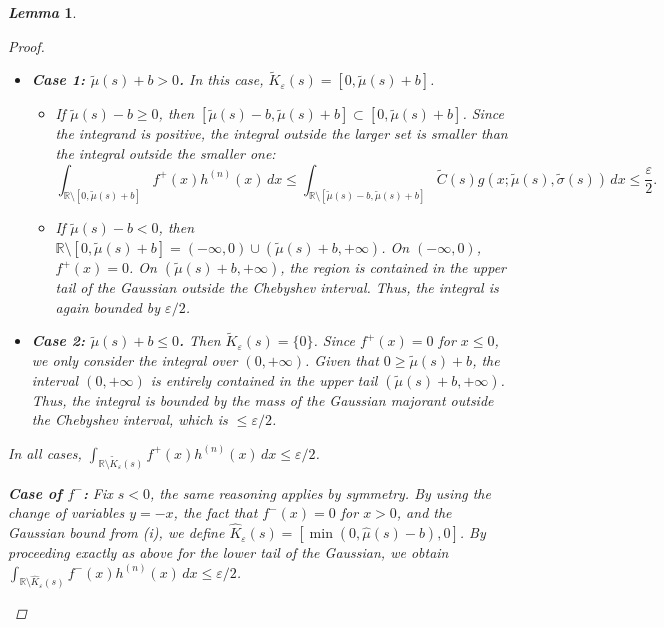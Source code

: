 \documentclass[review]{elsarticle}
\newtheorem{lemma}{\em Lemma}
\begin{document}
\begin{lemma}
\begin{proof}
\begin{enumerate}
\begin{itemize}
    \item \textbf{Case 1: $\widetilde{\mu}(s) + b > 0$.} 
    In this case, $\widetilde{K}_{\varepsilon}(s) = [0, \widetilde{\mu}(s) + b]$.
    \begin{itemize}
        \item If $\widetilde{\mu}(s) - b \geq 0$, then $[\widetilde{\mu}(s) - b, \widetilde{\mu}(s) + b] \subset [0, \widetilde{\mu}(s) + b]$. Since the integrand is positive, the integral outside the larger set is smaller than the integral outside the smaller one:
        \begin{equation*}
        \int_{\mathbb{R} \setminus [0, \widetilde{\mu}(s) + b]} f^+(x)h^{(n)}(x) \, dx \leq \int_{\mathbb{R} \setminus [\widetilde{\mu}(s) - b, \widetilde{\mu}(s) + b]} \widetilde{C}(s) g(x; \widetilde{\mu}(s), \widetilde{\sigma}(s)) \, dx \leq \frac{\varepsilon}{2}.
        \end{equation*}
        \item If $\widetilde{\mu}(s) - b < 0$, then $\mathbb{R} \setminus [0, \widetilde{\mu}(s) + b] = (-\infty, 0) \cup (\widetilde{\mu}(s) + b, +\infty)$. On $(-\infty, 0)$, $f^+(x) = 0$. On $(\widetilde{\mu}(s) + b, +\infty)$, the region is contained in the upper tail of the Gaussian outside the Chebyshev interval. Thus, the integral is again bounded by $\varepsilon/2$.
    \end{itemize}

    \item \textbf{Case 2: $\widetilde{\mu}(s) + b \leq 0$.}
    Then $\widetilde{K}_{\varepsilon}(s) = \{0\}$. Since $f^+(x) = 0$ for $x \leq 0$, we only consider the integral over $(0, +\infty)$. Given that $0 \geq \widetilde{\mu}(s) + b$, the interval $(0, +\infty)$ is entirely contained in the upper tail $(\widetilde{\mu}(s) + b, +\infty)$. Thus, the integral is bounded by the mass of the Gaussian majorant outside the Chebyshev interval, which is $\leq \varepsilon/2$.
    
\end{itemize}


In all cases, $\int_{\mathbb{R} \setminus \widetilde{K}_{\varepsilon}(s)} f^+(x)h^{(n)}(x) \, dx \leq \varepsilon/2$.

\textbf{Case of $f^-$:} Fix $s<0$, the same reasoning applies by symmetry. By using the change of variables $y = -x$, the fact that $f^-(x) = 0$ for $x > 0$, and the Gaussian bound from (i), we define $\widehat{K}_{\varepsilon}(s) = [\min(0, \widehat{\mu}(s) - b), 0]$. By proceeding exactly as above for the lower tail of the Gaussian, we obtain $\int_{\mathbb{R} \setminus \widehat{K}_{\varepsilon}(s)} f^-(x)h^{(n)}(x) \, dx \leq \varepsilon/2$.

      
\end{enumerate}
\end{proof}
\end{lemma}
\end{document}
